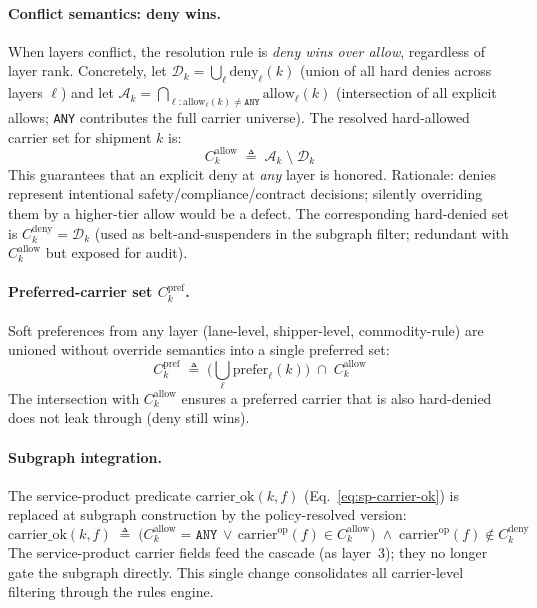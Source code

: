 \documentclass[11pt,a4paper]{article}
\newcommand{\defeq}{\triangleq}
\theoremstyle{definition}
\begin{document}
\paragraph{Conflict semantics: deny wins.}
When layers conflict, the resolution rule is \emph{deny wins over allow}, regardless
of layer rank. Concretely, let $\mathcal{D}_k = \bigcup_{\ell} \text{deny}_\ell(k)$
(union of all hard denies across layers $\ell$) and let $\mathcal{A}_k =
\bigcap_{\ell : \text{allow}_\ell(k) \neq \texttt{ANY}} \text{allow}_\ell(k)$
(intersection of all explicit allows; \texttt{ANY} contributes the full carrier
universe). The resolved hard-allowed carrier set for shipment $k$ is:
\begin{equation}
  C_k^{\text{allow}} \;\defeq\; \mathcal{A}_k \;\setminus\; \mathcal{D}_k
  \label{eq:carrier-allow}
\end{equation}
This guarantees that an explicit deny at \emph{any} layer is honored. Rationale:
denies represent intentional safety/compliance/contract decisions; silently
overriding them by a higher-tier allow would be a defect. The corresponding
hard-denied set is $C_k^{\text{deny}} = \mathcal{D}_k$ (used as belt-and-suspenders
in the subgraph filter; redundant with $C_k^{\text{allow}}$ but exposed for audit).

\paragraph{Preferred-carrier set $C_k^{\text{pref}}$.}
Soft preferences from any layer (lane-level, shipper-level, commodity-rule) are
unioned without override semantics into a single preferred set:
\begin{equation}
  C_k^{\text{pref}} \;\defeq\; \biggl( \bigcup_{\ell} \text{prefer}_\ell(k) \biggr)
                              \;\cap\; C_k^{\text{allow}}
  \label{eq:carrier-pref}
\end{equation}
The intersection with $C_k^{\text{allow}}$ ensures a preferred carrier that is also
hard-denied does not leak through (deny still wins).

\paragraph{Subgraph integration.}
The service-product predicate $\text{carrier\_ok}(k, f)$ (Eq.~\ref{eq:sp-carrier-ok})
is replaced at subgraph construction by the policy-resolved version:
\begin{equation}
  \text{carrier\_ok}(k, f) \;\defeq\;
    \bigl(C_k^{\text{allow}} = \texttt{ANY} \,\vee\, \text{carrier}^{\text{op}}(f) \in C_k^{\text{allow}}\bigr)
    \;\wedge\; \text{carrier}^{\text{op}}(f) \notin C_k^{\text{deny}}
  \label{eq:carrier-ok-resolved}
\end{equation}
The service-product carrier fields feed the cascade (as layer~3); they no longer
gate the subgraph directly. This single change consolidates all carrier-level
filtering through the rules engine.
\end{document}
